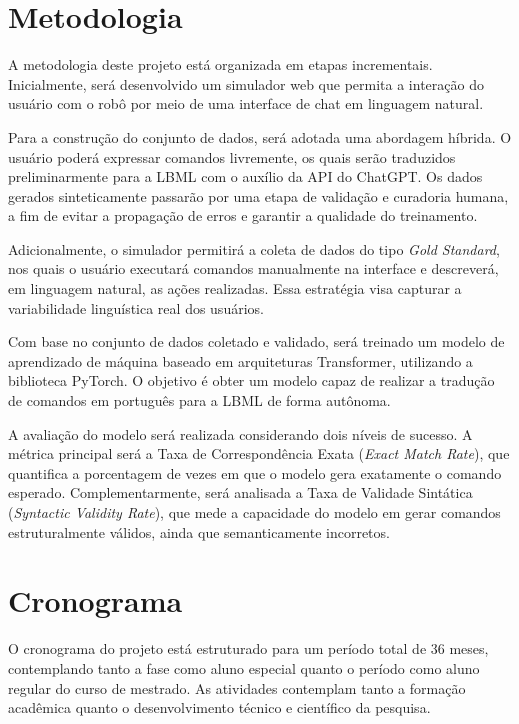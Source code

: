 \documentclass{article}
\begin{document}
\section{Metodologia}

A metodologia deste projeto está organizada em etapas incrementais. Inicialmente, será desenvolvido um simulador web que permita a interação do usuário com o robô por meio de uma interface de chat em linguagem natural.

Para a construção do conjunto de dados, será adotada uma abordagem híbrida. O usuário poderá expressar comandos livremente, os quais serão traduzidos preliminarmente para a LBML com o auxílio da API do ChatGPT. Os dados gerados sinteticamente passarão por uma etapa de validação e curadoria humana, a fim de evitar a propagação de erros e garantir a qualidade do treinamento.

Adicionalmente, o simulador permitirá a coleta de dados do tipo \textit{Gold Standard}, nos quais o usuário executará comandos manualmente na interface e descreverá, em linguagem natural, as ações realizadas. Essa estratégia visa capturar a variabilidade linguística real dos usuários.

Com base no conjunto de dados coletado e validado, será treinado um modelo de aprendizado de máquina baseado em arquiteturas Transformer, utilizando a biblioteca PyTorch. O objetivo é obter um modelo capaz de realizar a tradução de comandos em português para a LBML de forma autônoma.

A avaliação do modelo será realizada considerando dois níveis de sucesso. A métrica principal será a Taxa de Correspondência Exata (\textit{Exact Match Rate}), que quantifica a porcentagem de vezes em que o modelo gera exatamente o comando esperado. Complementarmente, será analisada a Taxa de Validade Sintática (\textit{Syntactic Validity Rate}), que mede a capacidade do modelo em gerar comandos estruturalmente válidos, ainda que semanticamente incorretos.

\section{Cronograma}

O cronograma do projeto está estruturado para um período total de 36 meses, contemplando tanto a fase como aluno especial quanto o período como aluno regular do curso de mestrado.
As atividades contemplam tanto a formação acadêmica quanto o desenvolvimento técnico e científico da pesquisa.
\end{document}
